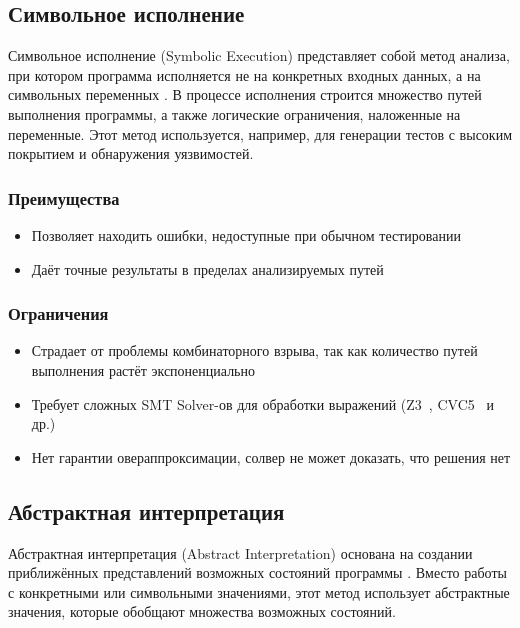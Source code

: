 \newpage
\subsection{Символьное исполнение}

Символьное исполнение (Symbolic Execution) представляет собой метод анализа, при котором программа исполняется не на конкретных входных данных, а на символьных переменных \cite{King76}. В процессе исполнения строится множество путей выполнения программы, а также логические ограничения, наложенные на переменные. Этот метод используется, например, для генерации тестов с высоким покрытием и обнаружения уязвимостей.

\subsubsection*{Преимущества}
\begin{itemize}
\item Позволяет находить ошибки, недоступные при обычном тестировании \cite{SymbolicTesting}
\item Даёт точные результаты в пределах анализируемых путей
\end{itemize}

\subsubsection*{Ограничения}
\begin{itemize}
\item Страдает от проблемы комбинаторного взрыва, так как количество путей выполнения растёт экспоненциально \cite{PathExplosion}
\item Требует сложных SMT Solver-ов для обработки выражений (Z3~\cite{Z3}, CVC5~\cite{CVC5} и др.)
\item Нет гарантии овераппроксимации, солвер не может доказать, что решения нет
\end{itemize}




\newpage
\subsection{Абстрактная интерпретация}

Абстрактная интерпретация (Abstract Interpretation) основана на создании приближённых представлений возможных состояний программы \cite{CousotCousot92}. Вместо работы с конкретными или символьными значениями, этот метод использует абстрактные значения, которые обобщают множества возможных состояний.

